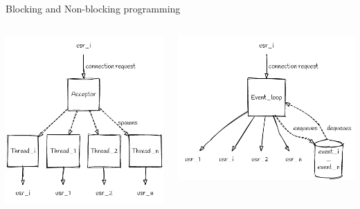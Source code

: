 \documentclass{beamer}
\begin{document}
\begin{frame}{Blocking and Non-blocking programming}
    \begin{columns}
        \begin{column}{0.5\textwidth}
            \includegraphics[width=\textwidth]{assets/acceptor_system.png}
        \end{column}
        \begin{column}{0.5\textwidth}
            \includegraphics[width=\textwidth]{assets/event_queue.png}
        \end{column}
    \end{columns}
\end{frame}
\end{document}
